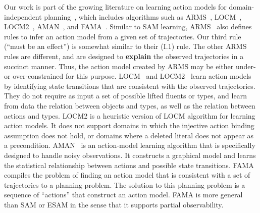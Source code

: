 \documentclass{article}
\begin{document}
Our work is part of the growing literature on learning action models for domain-independent planning~\cite{arora2018review}, which includes algorithms such as ARMS~\cite{yang2007learning}, LOCM~\cite{cresswell2013acquiring}, LOCM2~\cite{cresswell2011generalised}, AMAN~\cite{zhuo2013action}, and FAMA~\cite{aineto19}. 
Similar to SAM learning, ARMS~\cite{yang2007learning} also defines rules to infer an action model from a given set of trajectories. 
Our third rule (``must be an effect'') is somewhat similar to their (I.1) rule. 
The other ARMS rules are different, and are designed to \textbf{explain} the observed trajectories in a succinct manner. Thus, the action model created by ARMS may be either under- or over-constrained for this purpose. %
LOCM~\cite{cresswell2013acquiring} and LOCM2~\cite{cresswell2011generalised} 
learn action models by identifying state transitions that are consistent with the observed trajectories. They do not require as input a set of possible lifted fluents or types, and learn from data the relation between objects and types, as well as the relation between actions and types. 
LOCM2 is a heuristic version of LOCM algorithm for learning action models. It does not support domains in which the injective action binding assumption does not hold, or domains where a deleted literal does not appear as a precondition. 
AMAN~\cite{zhuo2013action} is an action-model learning algorithm that is specifically designed to handle noisy observations. It constructs a graphical model and learns the statistical relationship between actions and possible state transitions. 
FAMA~\cite{aineto19} compiles the problem of finding an action model that is consistent with a set of trajectories to a planning problem. The solution to this planning problem is a sequence of ``actions'' that construct an action model. FAMA is more general than SAM or ESAM in the sense that it supports partial observability. 
\end{document}
